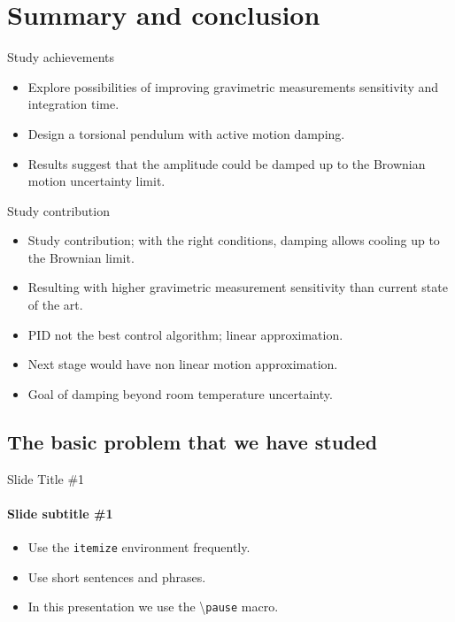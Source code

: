 \documentclass{beamer}
\begin{document}
\section{Summary and conclusion}
\begin{frame}{Study achievements}
	\begin{itemize}
		
		
		\item Explore possibilities of improving gravimetric measurements sensitivity and integration time. 
		\item Design a torsional pendulum with active motion damping. 
		\pause
		\item Results suggest that the amplitude could be damped up to the Brownian motion uncertainty limit. 
		
		
	\end{itemize}
\end{frame}

\begin{frame}{Study contribution}
	\begin{itemize}
		
		\item Study contribution; with the right conditions, damping allows cooling up to the Brownian limit. 
		\item Resulting with higher gravimetric measurement sensitivity than current state of the art.
		\pause
		\item PID not the best control algorithm; linear approximation. 
		\item Next stage would have non linear motion approximation.
		\item Goal of damping beyond room temperature uncertainty. 
	\end{itemize}
\end{frame}


\iffalse

\subsection[Basic Problem]{The basic problem that we have studed}

\begin{frame}{Slide Title \#1}
	\framesubtitle{Slide subtitle \#1}
	\begin{itemize}
		\item Use the \texttt{itemize} environment frequently.
		\pause
		\item Use short sentences and phrases.
		\pause
		\item In this presentation we use the \textbackslash{}\texttt{pause} macro.
	\end{itemize}
\end{frame}
\end{document}
